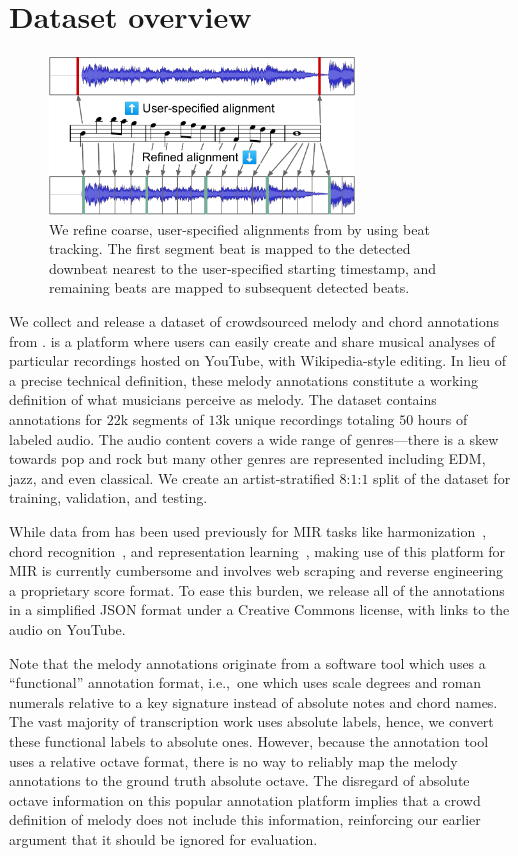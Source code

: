 \section{Dataset overview}
\label{sec:dataset}

\begin{figure}
    \centering
    \includegraphics[width=8.1cm]{figs/alignment.pdf}
    \caption{We refine coarse, user-specified alignments from \hooktheory{} by using beat tracking. The first segment beat is mapped to the detected downbeat nearest to the user-specified starting timestamp, and remaining beats are mapped to subsequent detected beats.}
 \label{fig:alignment}
\end{figure}

We collect and release a dataset of crowdsourced melody and chord annotations from \hooktheory{}. 
\hooktheory{} is a platform where users can easily create and share musical analyses of particular recordings hosted on YouTube, with Wikipedia-style editing. 
In lieu of a precise technical definition, these melody annotations constitute a working definition of what musicians perceive as melody. 
The dataset contains annotations for $22$k segments of $13$k unique recordings totaling $50$ hours of labeled audio. 
The audio content covers a wide range of genres---there is a skew towards pop and rock but many other genres are represented including EDM, jazz, and even classical. 
We create an artist-stratified $8$:$1$:$1$ split of the dataset for training, validation, and testing.

While data from \hooktheory{} has been used previously for MIR tasks like 
harmonization~\cite{chen2021surprisenet,yeh2021automatic}, 
chord recognition~\cite{jiang2019mirex}, and 
representation learning~\cite{jiang2020transformer}, 
making use of this platform for MIR is currently cumbersome and involves web scraping and reverse engineering a proprietary score format. 
To ease this burden, we release all of the annotations in a simplified JSON format under a Creative Commons license, with links to the audio on YouTube.

Note that the melody annotations originate from a software tool which uses a ``functional'' annotation format, i.e.,~one which uses scale degrees and roman numerals relative to a key signature instead of absolute notes and chord names. 
The vast majority of transcription work uses absolute labels, hence, we convert these functional labels to absolute ones. 
However, because the annotation tool uses a relative octave format, there is no way to reliably map the melody annotations to the ground truth absolute octave. 
The disregard of absolute octave information on this popular annotation platform implies that a crowd definition of melody does not include this information, reinforcing our earlier argument that it should be ignored for evaluation.


